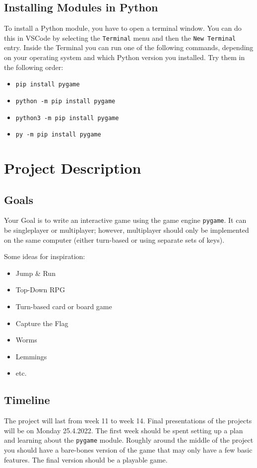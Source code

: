 \documentclass[11pt,a4paper]{report}
\begin{document}
\subsection{Installing Modules in Python}

To install a Python module, you have to open a terminal window. You can do this
in VSCode by selecting the \verb|Terminal| menu and then the \verb|New Terminal| 
entry. Inside the Terminal you can run one of the following commands, depending
on your operating system and which Python version you installed. Try them in
the following order:

\begin{itemize}
    \item \verb|pip install pygame|
    \item \verb|python -m pip install pygame|
    \item \verb|python3 -m pip install pygame|
    \item \verb|py -m pip install pygame|
\end{itemize}


\section{Project Description}

\subsection{Goals} 
Your Goal is to write an interactive game using the game engine \verb|pygame|. It can be singleplayer or multiplayer; however, multiplayer should only be implemented on the same computer (either turn-based or using separate sets of keys).

Some ideas for inspiration:
\begin{itemize}
\item Jump \& Run
\item Top-Down RPG
\item Turn-based card or board game
\item Capture the Flag
\item Worms
\item Lemmings
\item etc.
\end{itemize}
\subsection{Timeline}
The project will last from week 11 to week 14. Final presentations of the projects will be on Monday 25.4.2022. The first week should be spent setting up a plan and learning about the \verb|pygame| module. Roughly around the middle of the project you should have a bare-bones version of the game that may only have a few basic features. The final version should be a playable game.
\end{document}
